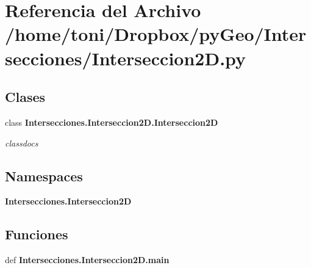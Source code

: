 \section{Referencia del Archivo /home/toni/\-Dropbox/py\-Geo/\-Intersecciones/\-Interseccion2\-D.py}
\label{Interseccion2D_8py}
\subsection*{Clases}
\begin{DoxyCompactItemize}
\item 
class {\bf Intersecciones.\-Interseccion2\-D.\-Interseccion2\-D}
\begin{DoxyCompactList}\small\item\em classdocs \end{DoxyCompactList}\end{DoxyCompactItemize}
\subsection*{Namespaces}
\begin{DoxyCompactItemize}
\item 
{\bf Intersecciones.\-Interseccion2\-D}
\end{DoxyCompactItemize}
\subsection*{Funciones}
\begin{DoxyCompactItemize}
\item 
def {\bf Intersecciones.\-Interseccion2\-D.\-main}
\end{DoxyCompactItemize}
